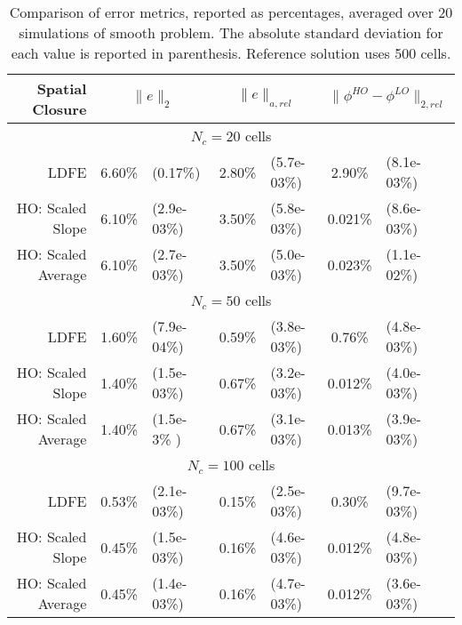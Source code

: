\begin{table}[H]
    \caption{\label{tab:smooth} Comparison of error metrics, reported as percentages, averaged over 20 simulations of smooth problem.  The absolute
standard deviation for each value is reported in parenthesis. Reference solution uses 500 cells.}
    \begin{tabular}{|r|cl|cl|cl|} \hline
        Spatial Closure & \multicolumn{2}{|c|}{$\|e\|_2$}  &
        \multicolumn{2}{|c|}{$\|e\|_{a,rel}$} & \multicolumn{2}{|c|}{$\|\phi^{HO}
        -\phi^{LO}\|_{2,rel}$} \\  \hline \hline
        \multicolumn{7}{|c|}{$N_c = 20$ cells} \\ \hline
LDFE               &   6.60\%  &   (0.17\%)  &   2.80\%     &   (5.7e-03\%)  &   2.90\%   &  (8.1e-03\%)  \\
HO: Scaled Slope   &   6.10\%  &   (2.9e-03\%)  &   3.50\%  &   (5.8e-03\%)  &   0.021\%  &  (8.6e-03\%)  \\
HO: Scaled Average &   6.10\%  &   (2.7e-03\%)  &   3.50\%  &   (5.0e-03\%)  &   0.023\%  &  (1.1e-02\%)  \\ \hline
       \multicolumn{7}{|c|}{$N_c  = 50$ cells}   \\ \hline
LDFE               &   1.60\%  &   (7.9e-04\%)  &   0.59\%  &   (3.8e-03\%)  &   0.76\%  &  (4.8e-03\%)  \\
HO: Scaled Slope   &   1.40\%  &   (1.5e-03\%)  &   0.67\%  &   (3.2e-03\%)  &   0.012\%  &  (4.0e-03\%)  \\
HO: Scaled Average &   1.40\%  &   (1.5e-3\% ) &   0.67\%   &   (3.1e-03\%)  &   0.013\%  &  (3.9e-03\%)  \\ \hline
       \multicolumn{7}{|c|}{$N_c  = 100$ cells}   \\ \hline
LDFE               &   0.53\%  &   (2.1e-03\%)  &   0.15\%  &   (2.5e-03\%)  &   0.30\%  &  (9.7e-03\%)  \\
HO: Scaled Slope   &   0.45\%  &   (1.5e-03\%)  &   0.16\%  &   (4.6e-03\%)  &   0.012\%  &  (4.8e-03\%)  \\
HO: Scaled Average &   0.45\%  &   (1.4e-03\%)  &   0.16\%  &   (4.7e-03\%)  &   0.012\%  &  (3.6e-03\%)  \\ \hline
    \end{tabular}
\end{table}

